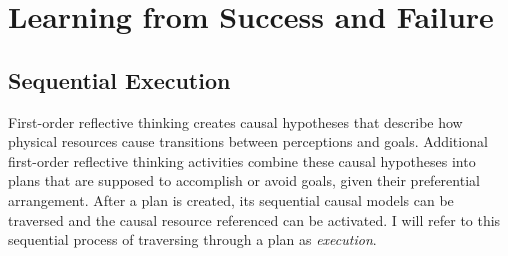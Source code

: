 \chapter{Learning from Success and Failure}
\label{chapter:learning_from_success_and_failure}

\section{Sequential Execution}

First-order reflective thinking creates causal hypotheses that
describe how physical resources cause transitions between perceptions
and goals.  Additional first-order reflective thinking activities
combine these causal hypotheses into plans that are supposed to
accomplish or avoid goals, given their preferential arrangement.
After a plan is created, its sequential causal models can be traversed
and the causal resource referenced can be activated.  I will refer to
this sequential process of traversing through a plan as
\emph{execution}.


